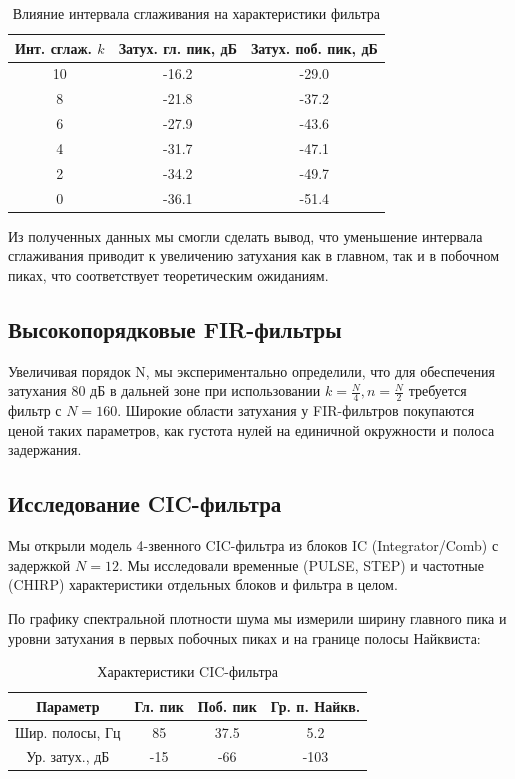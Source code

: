 \begin{longtable}[c]{|c|c|c|}
\caption{Влияние интервала сглаживания на характеристики фильтра}
\label{tab:smoothing_interval}\\
\hline
Инт. сглаж. $k$ & Затух. гл. пик, дБ & Затух. поб. пик, дБ \\ \hline
\endfirsthead
%
\endhead
%
10 & -16.2 & -29.0 \\ \hline
8 & -21.8 & -37.2 \\ \hline
6 & -27.9 & -43.6 \\ \hline
4 & -31.7 & -47.1 \\ \hline
2 & -34.2 & -49.7 \\ \hline
0 & -36.1 & -51.4 \\ \hline
\end{longtable}

Из полученных данных мы смогли сделать вывод, что уменьшение интервала сглаживания приводит к увеличению затухания как в главном, так и в побочном пиках, что соответствует теоретическим ожиданиям.

\subsection{Высокопорядковые FIR-фильтры}
Увеличивая порядок N, мы экспериментально определили, что для обеспечения затухания 80 дБ в дальней зоне при использовании $k = \frac{N}{4}, n = \frac{N}{2}$ требуется фильтр с $N = 160$. Широкие области затухания у FIR-фильтров покупаются ценой таких параметров, как густота нулей на единичной окружности и полоса задержания.

\subsection{Исследование CIC-фильтра}
Мы открыли модель 4-звенного CIC-фильтра из блоков IC (Integrator/Comb) с задержкой $N = 12$. Мы исследовали временные (PULSE, STEP) и частотные (CHIRP) характеристики отдельных блоков и фильтра в целом. 

По графику спектральной плотности шума мы измерили ширину главного пика и уровни затухания в первых побочных пиках и на границе полосы Найквиста:

\begin{longtable}[c]{|c|c|c|c|}
\caption{Характеристики CIC-фильтра}
\label{tab:cic_filter}\\
\hline
Параметр & Гл. пик & Поб. пик & Гр. п. Найкв. \\ \hline
\endfirsthead
%
\endhead
%
Шир. полосы, Гц & 85 & 37.5 & 5.2 \\ \hline
Ур. затух., дБ & -15 & -66 & -103 \\ \hline
\end{longtable}

